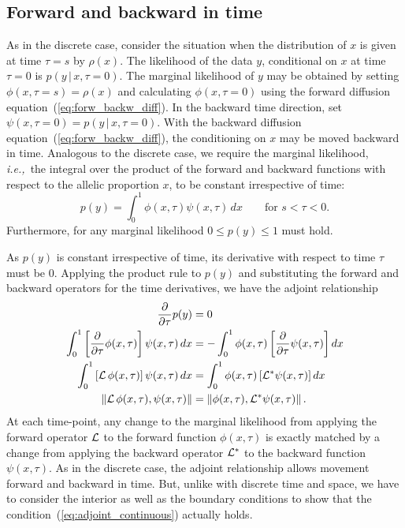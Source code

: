 \documentclass[preprint]{elsarticle}
\newcommand\given{{\,|\,}}
\newcommand{\norm}[1]{\left\lVert#1\right\rVert}
\newcommand\ie{{\it i.e.,}}
\newcommand\s{\ensuremath{s}}
\begin{document}
\subsection{Forward and backward in time}

As in the discrete case, consider the situation when the distribution of $x$ is given at time $\tau=\s$ by $\rho(x)$. The likelihood of the data $y$, conditional on $x$ at time $\tau=0$ is $p(y\given x,\tau=0)$. The marginal likelihood of $y$ may be obtained by setting $\phi(x,\tau=\s)=\rho(x)$ and calculating $\phi(x,\tau=0)$ using the forward diffusion equation~(\ref{eq:forw_backw_diff}). In the backward time direction, set  $\psi(x,\tau=0)=p(y\given x,\tau=0)$. With the backward diffusion equation~(\ref{eq:forw_backw_diff}), the conditioning on $x$ may be moved backward in time. Analogous to the discrete case, we require the marginal likelihood, \ie\ the integral over the product of the forward and backward functions with respect to the allelic proportion $x$, to be constant irrespective of time:
\begin{equation}\label{eq:marg_like}
p(y) = \int_{0}^{1} \phi(x,\tau)\psi(x,\tau)  \,dx \qquad\text{for $s<\tau<0$.}
\end{equation}
Furthermore, for any marginal likelihood $0\leq p(y) \leq 1$ must hold.

As $p(y)$ is constant irrespective of time, its derivative with respect to time $\tau$ must be $0$. Applying the product rule to $p(y)$ and substituting the forward and backward operators for the time derivatives, we have the adjoint relationship
\begin{equation}\label{eq:adjoint_continuous}
\begin{split}
 \frac{\partial}{\partial\tau} p(y) &= 0\\
\int_{0}^{1} \left[\frac{\partial}{\partial\tau} \phi(x,\tau)\right] \psi(x,\tau)\,dx &= -\int_{0}^{1} \phi(x,\tau) \left[\frac{\partial}{\partial\tau} \psi(x,\tau)\right] dx\\
\int_{0}^{1} \left[{\cal L}\,\phi(x,\tau)\right] \psi(x,\tau)\,dx &= \int_{0}^{1}  \phi(x,\tau) \left[{\cal L}^{*} \psi(x,\tau)\right] dx\\
\norm{{\cal L}\,\phi(x,\tau), \psi(x,\tau)} &= \norm{ \phi(x,\tau),{\cal L}^{*} \psi(x,\tau)}.
\end{split}
\end{equation}
 At each time-point, any change to the marginal likelihood from applying the forward operator ${\cal L}$ to the forward function $\phi(x,\tau)$ is exactly matched by a change from applying the backward operator ${\cal L}^{*}$ to the backward function $\psi(x,\tau)$. As in the discrete case, the adjoint relationship allows movement forward and backward in time. But, unlike with discrete time and space, we have to consider the interior as well as the boundary conditions to show that the condition~(\ref{eq:adjoint_continuous}) actually holds. 
\end{document}
